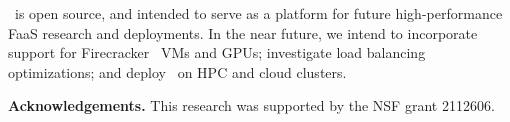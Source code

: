 \sysname~is open source, and intended to serve as a platform for future high-performance FaaS research and deployments.
In the near future, we intend to incorporate support for  Firecracker~\cite{firecracker-nsdi20}  VMs and GPUs; investigate load balancing optimizations; and deploy \sysname~on HPC and cloud clusters. 

\noindent \textbf{Acknowledgements.}
This research was supported by the NSF grant 2112606. 

